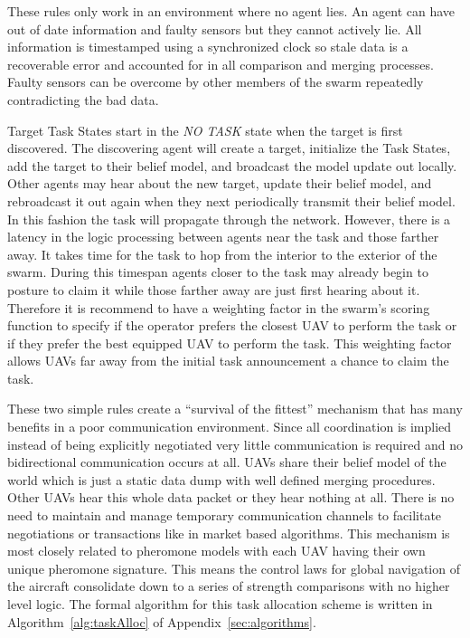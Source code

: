 These rules only work in an environment where no agent lies.  An agent can have out of date information and faulty sensors but they cannot actively lie.  All information is timestamped using a synchronized clock so stale data is a recoverable error and accounted for in all comparison and merging processes.  Faulty sensors can be overcome by other members of the swarm repeatedly contradicting the bad data.

Target Task States start in the \textit{NO TASK} state when the target is first discovered.  The discovering agent will create a target, initialize the Task States,  add the target to their belief model, and broadcast the model update out locally.  Other agents may hear about the new target, update their belief model, and rebroadcast it out again when they next periodically transmit their belief model.  In this fashion the task will propagate through the network.  However, there is a latency in the logic processing between agents near the task and those farther away.  It takes time for the task to hop from the interior to the exterior of the swarm.  During this timespan agents closer to the task may already begin to posture to claim it while those farther away are just first hearing about it.  Therefore it is recommend to have a weighting factor in the swarm's scoring function to specify if the operator prefers the closest UAV to perform the task or if they prefer the best equipped UAV to perform the task.  This weighting factor allows UAVs far away from the initial task announcement a chance to claim the task.

These two simple rules create a ``survival of the fittest'' mechanism that has many benefits in a poor communication environment.  Since all coordination is implied instead of being explicitly negotiated very little communication is required and no bidirectional communication occurs at all.  UAVs share their belief model of the world which is just a static data dump with well defined merging procedures.  Other UAVs hear this whole data packet or they hear nothing at all.  There is no need to maintain and manage temporary communication channels to facilitate negotiations or transactions like in market based algorithms.  This mechanism is most closely related to pheromone models with each UAV having their own unique pheromone signature.  This means the control laws for global navigation of the aircraft consolidate down to a series of strength comparisons with no higher level logic.  The formal algorithm for this task allocation scheme is written in Algorithm~\ref{alg:taskAlloc} of Appendix~\ref{sec:algorithms}.

